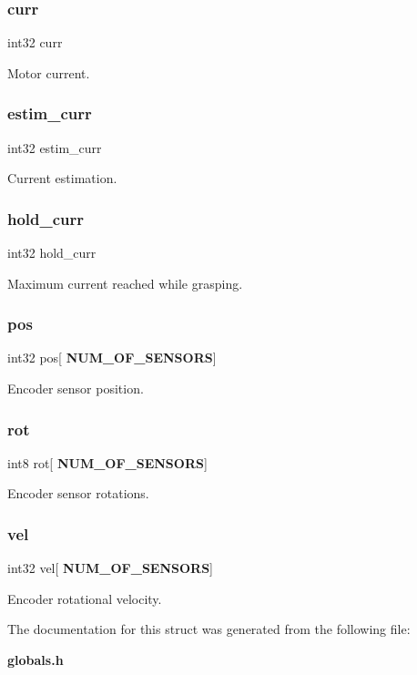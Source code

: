 \subsubsection{curr}
{\footnotesize\ttfamily int32 curr}

Motor current. \mbox{\label{structst__meas_a9d427d34982a34de7c1b8be206c2e740}} 
\subsubsection{estim\+\_\+curr}
{\footnotesize\ttfamily int32 estim\+\_\+curr}

Current estimation. \mbox{\label{structst__meas_a7e865f384a338d8df06626e346986ddc}} 
\subsubsection{hold\+\_\+curr}
{\footnotesize\ttfamily int32 hold\+\_\+curr}

Maximum current reached while grasping. \mbox{\label{structst__meas_a3ee4913e7257d25d3e47cbbada9c8546}} 
\subsubsection{pos}
{\footnotesize\ttfamily int32 pos[\textbf{ N\+U\+M\+\_\+\+O\+F\+\_\+\+S\+E\+N\+S\+O\+RS}]}

Encoder sensor position. \mbox{\label{structst__meas_a26b47db1884c475bc42d76a709349f97}} 
\subsubsection{rot}
{\footnotesize\ttfamily int8 rot[\textbf{ N\+U\+M\+\_\+\+O\+F\+\_\+\+S\+E\+N\+S\+O\+RS}]}

Encoder sensor rotations. \mbox{\label{structst__meas_a8ef1e0e837efdf852aa286d20625d6a1}} 
\subsubsection{vel}
{\footnotesize\ttfamily int32 vel[\textbf{ N\+U\+M\+\_\+\+O\+F\+\_\+\+S\+E\+N\+S\+O\+RS}]}

Encoder rotational velocity. 

The documentation for this struct was generated from the following file\+:\begin{DoxyCompactItemize}
\item 
\textbf{ globals.\+h}\end{DoxyCompactItemize}
